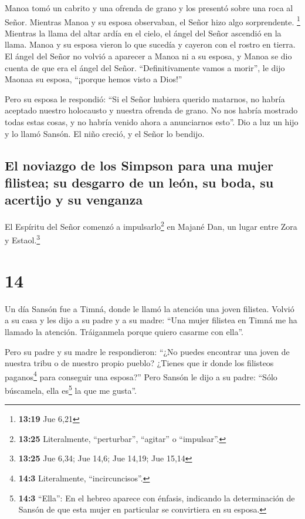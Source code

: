  Manoa tomó un cabrito y una ofrenda de grano y los
presentó sobre una roca al Señor. Mientras Manoa y su esposa observaban,
el Señor hizo algo sorprendente. \footnote{\textbf{13:19} Jue 6,21}
 Mientras la llama del altar ardía en el cielo, el ángel
del Señor ascendió en la llama. Manoa y su esposa vieron lo que sucedía
y cayeron con el rostro en tierra.  El ángel del Señor no
volvió a aparecer a Manoa ni a su esposa, y Manoa se dio cuenta de que
era el ángel del Señor.  ``Definitivamente vamos a
morir'', le dijo Maonaa su esposa, ``¡porque hemos visto a Dios!''

 Pero su esposa le respondió: ``Si el Señor hubiera
querido matarnos, no habría aceptado nuestro holocausto y nuestra
ofrenda de grano. No nos habría mostrado todas estas cosas, y no habría
venido ahora a anunciarnos esto''.  Dio a luz un hijo y
lo llamó Sansón. El niño creció, y el Señor lo bendijo.

\hypertarget{el-noviazgo-de-los-simpson-para-una-mujer-filistea-su-desgarro-de-un-leuxf3n-su-boda-su-acertijo-y-su-venganza}{%
\subsection{El noviazgo de los Simpson para una mujer filistea; su
desgarro de un león, su boda, su acertijo y su
venganza}\label{el-noviazgo-de-los-simpson-para-una-mujer-filistea-su-desgarro-de-un-leuxf3n-su-boda-su-acertijo-y-su-venganza}}

 El Espíritu del Señor comenzó a impulsarlo\footnote{\textbf{13:25}
  Literalmente, ``perturbar'', ``agitar'' o ``impulsar''.} en Majané
Dan, un lugar entre Zora y Estaol.\footnote{\textbf{13:25} Jue 6,34; Jue
  14,6; Jue 14,19; Jue 15,14}

\hypertarget{section-13}{%
\section{14}\label{section-13}}

 Un día Sansón fue a Timná, donde le llamó la atención una
joven filistea.  Volvió a su casa y les dijo a su padre y
a su madre: ``Una mujer filistea en Timná me ha llamado la atención.
Tráiganmela porque quiero casarme con ella''.

 Pero su padre y su madre le respondieron: ``¿No puedes
encontrar una joven de nuestra tribu o de nuestro propio pueblo? ¿Tienes
que ir donde los filisteos paganos\footnote{\textbf{14:3} Literalmente,
  ``incircuncisos''.} para conseguir una esposa?'' Pero Sansón le dijo a
su padre: ``Sólo búscamela, ella es\footnote{\textbf{14:3} ``Ella'': En
  el hebreo aparece con énfasis, indicando la determinación de Sansón de
  que esta mujer en particular se convirtiera en su esposa.} la que me
gusta''.

